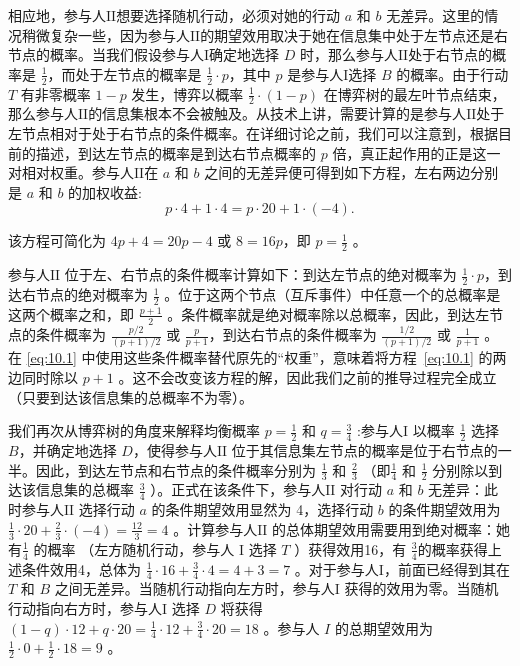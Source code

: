 相应地，参与人$\mathrm{II}$想要选择随机行动，必须对她的行动 \(a\) 和 \(b\) 无差异。这里的情况稍微复杂一些，因为参与人$\mathrm{II}$的期望效用取决于她在信息集中处于左节点还是右节点的概率。当我们假设参与人$\mathrm{I}$确定地选择 \(D\) 时，那么参与人$\mathrm{II}$处于右节点的概率是 \(\frac{1}{2}\)，而处于左节点的概率是 \(\frac{1}{2} \cdot  p\)，其中 \(p\) 是参与人$\mathrm{I}$选择 \(B\) 的概率。由于行动\(T\) 有非零概率 \(1 - p\) 发生，博弈以概率 \(\frac{1}{2} \cdot  \left( {1 - p}\right)\) 在博弈树的最左叶节点结束，那么参与人$\mathrm{II}$的信息集根本不会被触及。从技术上讲，需要计算的是参与人$\mathrm{II}$处于左节点相对于处于右节点的条件概率。在详细讨论之前，我们可以注意到，根据目前的描述，到达左节点的概率是到达右节点概率的 \(p\) 倍，真正起作用的正是这一对相对权重。参与人$\mathrm{II}$在 \(a\) 和 \(b\) 之间的无差异便可得到如下方程，左右两边分别是 \(a\) 和 \(b\) 的加权收益: \begin{equation}
\label{eq:10.1}
p \cdot  4 + 1 \cdot  4 = p \cdot  {20} + 1 \cdot  \left( {-4}\right).
\end{equation}

该方程可简化为 \({4p} + 4 = {20p} - 4\) 或 \(8 = {16p}\)，即 \(p = \frac{1}{2}\) 。

参与人\(\mathrm{II}\) 位于左、右节点的条件概率计算如下：到达左节点的绝对概率为 \(\frac{1}{2} \cdot  p\)，到达右节点的绝对概率为 \(\frac{1}{2}\) 。位于这两个节点（互斥事件）中任意一个的总概率是这两个概率之和，即 \(\frac{p + 1}{2}\) 。条件概率就是绝对概率除以总概率，因此，到达左节点的条件概率为 \(\frac{p/2}{\left( {p + 1}\right) /2}\) 或 \(\frac{p}{p + 1}\)，到达右节点的条件概率为 \(\frac{1/2}{\left( {p + 1}\right) /2}\) 或 \(\frac{1}{p + 1}\) 。在 \eqref{eq:10.1} 中使用这些条件概率替代原先的“权重”，意味着将方程~\eqref{eq:10.1} 的两边同时除以 \(p + 1\) 。这不会改变该方程的解，因此我们之前的推导过程完全成立（只要到达该信息集的总概率不为零）。

我们再次从博弈树的角度来解释均衡概率 \(p = \frac{1}{2}\) 和 \(q = \frac{3}{4}\) :参与人\(\mathrm{I}\) 以概率 \(\frac{1}{2}\) 选择 \(B\)，并确定地选择 \(D\)，使得参与人\(\mathrm{II}\) 位于其信息集左节点的概率是位于右节点的一半。因此，到达左节点和右节点的条件概率分别为 \(\frac{1}{3}\) 和 \(\frac{2}{3}\) （即\(\left. \frac{1}{4}\right.\) 和 \(\frac{1}{2}\) 分别除以到达该信息集的总概率 \(\frac{3}{4}\) ）。正式在该条件下，参与人\(\mathrm{II}\) 对行动 \(a\) 和 \(b\) 无差异：此时参与人\(\mathrm{II}\) 选择行动 \(a\) 的条件期望效用显然为 4，选择行动 \(b\) 的条件期望效用为 \(\frac{1}{3} \cdot  {20} + \frac{2}{3} \cdot  \left( {-4}\right)  = \frac{12}{3} = 4\) 。计算参与人\(\mathrm{II}\) 的总体期望效用需要用到绝对概率：她有\(\frac{1}{4}\) 的概率 （左方随机行动，参与人 \(\mathrm{I}\) 选择 \(T\) ）获得效用16，有 \(\frac{3}{4}\)的概率获得上述条件效用4，总体为 \(\frac{1}{4} \cdot  {16} + \frac{3}{4} \cdot  4 = 4 + 3 = 7\) 。对于参与人\(\mathrm{I}\)，前面已经得到其在 \(T\) 和 \(B\) 之间无差异。当随机行动指向左方时，参与人\(\mathrm{I}\) 获得的效用为零。当随机行动指向右方时，参与人\(\mathrm{I}\) 选择 \(D\) 将获得 \(\left( {1 - q}\right)  \cdot  {12} + q \cdot  {20} = \frac{1}{4} \cdot  {12} + \frac{3}{4} \cdot  {20} = {18}\) 。参与人 \(I\) 的总期望效用为 \(\frac{1}{2} \cdot  0 + \frac{1}{2} \cdot  {18} = 9\) 。

